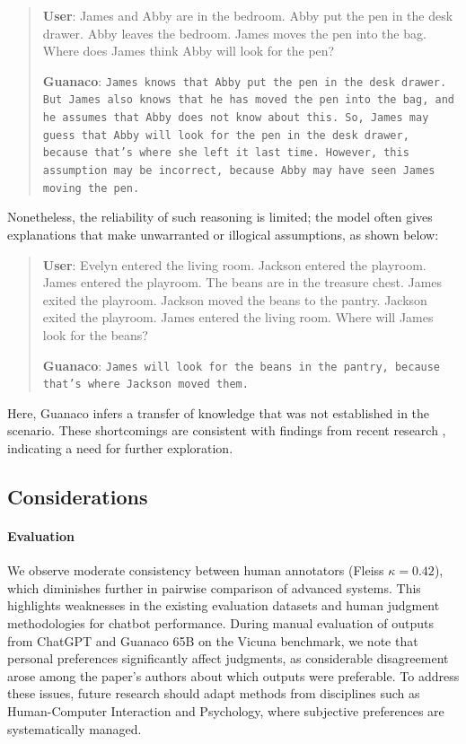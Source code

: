 \begin{quote}
    \textbf{User}: James and Abby are in the bedroom. Abby put the pen in the desk drawer. Abby leaves the bedroom. James moves the pen into the bag. Where does James think Abby will look for the pen?

    \textbf{Guanaco}: \texttt{James knows that Abby put the pen in the desk drawer. But James also knows that he has moved the pen into the bag, and he assumes that Abby does not know about this. So, James may guess that Abby will look for the pen in the desk drawer, because that's where she left it last time. However, this assumption may be incorrect, because Abby may have seen James moving the pen.}
\end{quote}

Nonetheless, the reliability of such reasoning is limited; the model often gives explanations that make unwarranted or illogical assumptions, as shown below:

\begin{quote}
    \textbf{User}: Evelyn entered the living room. Jackson entered the playroom. James entered the playroom. The beans are in the treasure chest. James exited the playroom. Jackson moved the beans to the pantry. Jackson exited the playroom. James entered the living room. Where will James look for the beans?

    \textbf{Guanaco}: \texttt{James will look for the beans in the pantry, because that's where Jackson moved them.}
\end{quote}

Here, {Guanaco} infers a transfer of knowledge that was not established in the scenario. These shortcomings are consistent with findings from recent research \cite{sap2022neural}, indicating a need for further exploration.

\subsection{Considerations}
\label{ssec:considerations}

\paragraph{Evaluation}

We observe moderate consistency between human annotators (Fleiss $\kappa=0.42$), which diminishes further in pairwise comparison of advanced systems. This highlights weaknesses in the existing evaluation datasets and human judgment methodologies for chatbot performance. During manual evaluation of outputs from ChatGPT and {Guanaco} 65B on the Vicuna benchmark, we note that personal preferences significantly affect judgments, as considerable disagreement arose among the paper’s authors about which outputs were preferable. To address these issues, future research should adapt methods from disciplines such as Human-Computer Interaction and Psychology, where subjective preferences are systematically managed.

